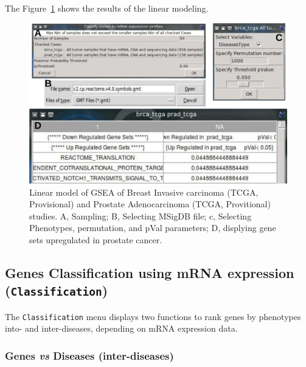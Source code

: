 \documentclass[a4paper]{article}
\begin{document}
The Figure~\ref{brstprstGSEAlm} shows the results of the linear modeling.
 
 \begin{figure}[!ht]
  \centering
 \includegraphics[scale=2]{image/BrstPrstGSEAlm.png}
 \caption{Linear model of GSEA of Breast Invasive carcinoma (TCGA, Provisional) and Prostate Adenocarcinoma (TCGA, Provitional) studies. A, Sampling; B, Selecting MSigDB file; c, Selecting Phenotypes, permutation, and pVal parameters; D, displying gene sets upregulated in prostate cancer.}
 \label{brstprstGSEAlm}
 \end{figure}




\subsection{Genes Classification using mRNA expression (\texttt{Classification})}
The \texttt{Classification} menu displays two functions to rank genes by phenotypes into- and inter-diseases, depending on mRNA expression data.

\subsubsection{Genes \emph{vs} Diseases (inter-diseases)}
\end{document}
